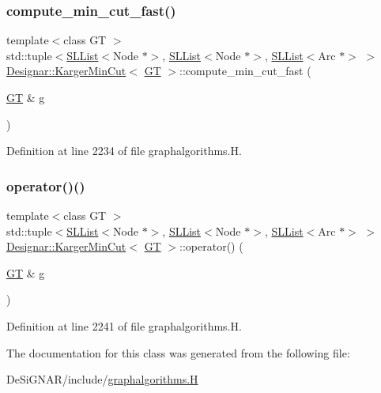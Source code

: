 \subsubsection{\texorpdfstring{compute\+\_\+min\+\_\+cut\+\_\+fast()}{compute\_min\_cut\_fast()}}
{\footnotesize\ttfamily template$<$class GT $>$ \\
std\+::tuple$<$\hyperlink{class_designar_1_1_s_l_list}{S\+L\+List}$<$Node $\ast$$>$, \hyperlink{class_designar_1_1_s_l_list}{S\+L\+List}$<$Node $\ast$$>$, \hyperlink{class_designar_1_1_s_l_list}{S\+L\+List}$<$Arc $\ast$$>$ $>$ \hyperlink{class_designar_1_1_karger_min_cut}{Designar\+::\+Karger\+Min\+Cut}$<$ \hyperlink{demo-buildgraph_8_c_a3001c40d2c31ca87ed96cd7d1334a55e}{GT} $>$\+::compute\+\_\+min\+\_\+cut\+\_\+fast (\begin{DoxyParamCaption}\item[{\hyperlink{demo-buildgraph_8_c_a3001c40d2c31ca87ed96cd7d1334a55e}{GT} \&}]{g }\end{DoxyParamCaption})\hspace{0.3cm}{\ttfamily [inline]}}



Definition at line 2234 of file graphalgorithms.\+H.

\mbox{\label{class_designar_1_1_karger_min_cut_a733802123d2510126abd4238688432ca}} 
\subsubsection{\texorpdfstring{operator()()}{operator()()}}
{\footnotesize\ttfamily template$<$class GT $>$ \\
std\+::tuple$<$\hyperlink{class_designar_1_1_s_l_list}{S\+L\+List}$<$Node $\ast$$>$, \hyperlink{class_designar_1_1_s_l_list}{S\+L\+List}$<$Node $\ast$$>$, \hyperlink{class_designar_1_1_s_l_list}{S\+L\+List}$<$Arc $\ast$$>$ $>$ \hyperlink{class_designar_1_1_karger_min_cut}{Designar\+::\+Karger\+Min\+Cut}$<$ \hyperlink{demo-buildgraph_8_c_a3001c40d2c31ca87ed96cd7d1334a55e}{GT} $>$\+::operator() (\begin{DoxyParamCaption}\item[{\hyperlink{demo-buildgraph_8_c_a3001c40d2c31ca87ed96cd7d1334a55e}{GT} \&}]{g }\end{DoxyParamCaption})\hspace{0.3cm}{\ttfamily [inline]}}



Definition at line 2241 of file graphalgorithms.\+H.



The documentation for this class was generated from the following file\+:\begin{DoxyCompactItemize}
\item 
De\+Si\+G\+N\+A\+R/include/\hyperlink{graphalgorithms_8_h}{graphalgorithms.\+H}\end{DoxyCompactItemize}
